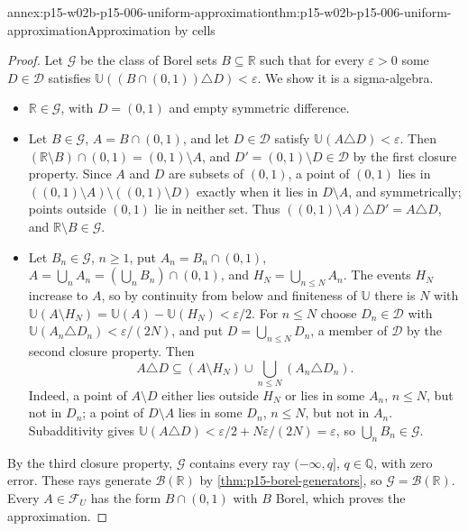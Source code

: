 \begin{annexitem}{annex:p15-w02b-p15-006-uniform-approximation}{thm:p15-w02b-p15-006-uniform-approximation}{Approximation by cells}
\begin{proof}
Let \(\mathcal G\) be the class of Borel sets \(B\subseteq\mathbb R\)
such that for every \(\varepsilon>0\) some \(D\in\mathcal D\) satisfies
\(\mathbb U((B\cap(0,1))\triangle D)<\varepsilon\). We show it is a
sigma-algebra.
\begin{itemize}
\item \(\mathbb R\in\mathcal G\), with \(D=(0,1)\) and empty symmetric
      difference.
\item Let \(B\in\mathcal G\), \(A=B\cap(0,1)\), and let \(D\in\mathcal D\)
      satisfy \(\mathbb U(A\triangle D)<\varepsilon\). Then
      \((\mathbb R\setminus B)\cap(0,1)=(0,1)\setminus A\), and
      \(D'=(0,1)\setminus D\in\mathcal D\) by the first closure property.
      Since \(A\) and \(D\) are subsets of \((0,1)\), a point of
      \((0,1)\) lies in \(((0,1)\setminus A)\setminus((0,1)\setminus D)\)
      exactly when it lies in \(D\setminus A\), and symmetrically; points
      outside \((0,1)\) lie in neither set. Thus
      \(((0,1)\setminus A)\triangle D'=A\triangle D\), and
      \(\mathbb R\setminus B\in\mathcal G\).
\item Let \(B_n\in\mathcal G\), \(n\geq1\), put \(A_n=B_n\cap(0,1)\),
      \(A=\bigcup_nA_n=(\bigcup_nB_n)\cap(0,1)\), and
      \(H_N=\bigcup_{n\leq N}A_n\). The events \(H_N\) increase to
      \(A\), so by continuity from below and finiteness of
      \(\mathbb U\) there is \(N\) with
      \(\mathbb U(A\setminus H_N)=\mathbb U(A)-\mathbb U(H_N)<\varepsilon/2\).
      For \(n\leq N\) choose \(D_n\in\mathcal D\) with
      \(\mathbb U(A_n\triangle D_n)<\varepsilon/(2N)\), and put
      \(D=\bigcup_{n\leq N}D_n\), a member of \(\mathcal D\) by the
      second closure property. Then
      \[
       A\triangle D\subseteq(A\setminus H_N)\cup
                     \bigcup_{n\leq N}(A_n\triangle D_n).
      \]
      Indeed, a point of \(A\setminus D\) either lies outside \(H_N\)
      or lies in some \(A_n\), \(n\leq N\), but not in \(D_n\); a point of
      \(D\setminus A\) lies in some \(D_n\), \(n\leq N\), but not in
      \(A_n\). Subadditivity gives
      \(\mathbb U(A\triangle D)<\varepsilon/2+N\varepsilon/(2N)=\varepsilon\),
      so \(\bigcup_nB_n\in\mathcal G\).
\end{itemize}
By the third closure property, \(\mathcal G\) contains every ray
\((-\infty,q]\), \(q\in\mathbb Q\), with zero error. These rays generate
\(\mathcal B(\mathbb R)\) by \cref{thm:p15-borel-generators}, so
\(\mathcal G=\mathcal B(\mathbb R)\). Every \(A\in\mathcal F_U\) has the
form \(B\cap(0,1)\) with \(B\) Borel, which proves the approximation.
\end{proof}
\end{annexitem}

